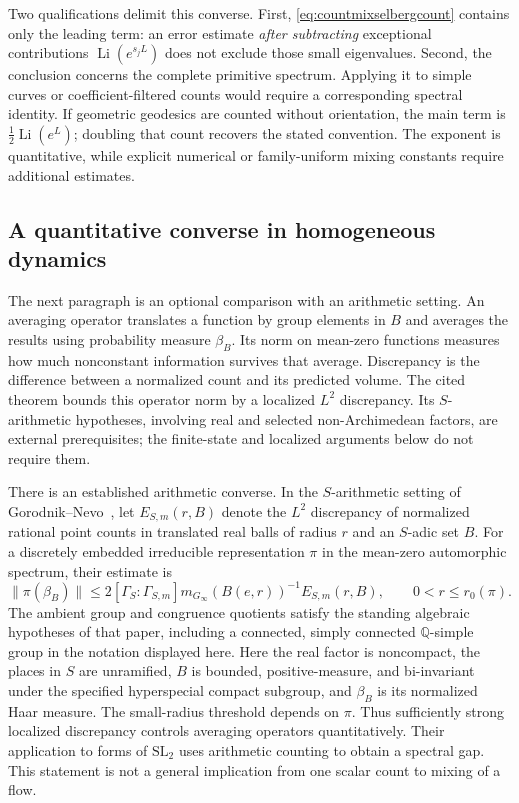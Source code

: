 Two qualifications delimit this converse. First,
\eqref{eq:countmixselbergcount} contains only the leading term:
an error estimate \emph{after subtracting} exceptional contributions
$\operatorname{Li}(e^{s_jL})$ does not exclude those small eigenvalues.
Second, the conclusion concerns the complete primitive spectrum.
Applying it to simple curves or coefficient-filtered counts would require
a corresponding spectral identity. If geometric geodesics are counted
without orientation, the main term is
$\tfrac12\operatorname{Li}(e^L)$; doubling that count recovers the stated
convention. The exponent is quantitative, while explicit numerical or
family-uniform mixing constants require additional estimates.

\subsection{A quantitative converse in homogeneous dynamics}

The next paragraph is an optional comparison with an arithmetic
setting. An averaging operator translates a function by group
elements in $B$ and averages the results using probability measure
$\beta_B$. Its norm on mean-zero functions measures how much
nonconstant information survives that average. Discrepancy is the
difference between a normalized count and its predicted volume.
The cited theorem bounds this operator norm by a localized $L^2$
discrepancy. Its $S$-arithmetic hypotheses, involving real and
selected non-Archimedean factors, are external prerequisites;
the finite-state and localized arguments below do not require them.

There is an established arithmetic converse. In the $S$-arithmetic
setting of Gorodnik--Nevo~\cite[Theorems 1.4 and 5.2]{GNDiscrepancy},
let $E_{S,m}(r,B)$ denote the $L^2$ discrepancy of normalized rational
point counts in translated real balls of radius $r$ and an
$S$-adic set $B$. For a discretely embedded irreducible representation
$\pi$ in the mean-zero automorphic spectrum, their estimate is
\begin{equation}
 \|\pi(\beta_B)\|
 \leq 2[\Gamma_S:\Gamma_{S,m}]
       m_{G_\infty}(B(e,r))^{-1}E_{S,m}(r,B),
 \qquad 0<r\leq r_0(\pi).
 \label{eq:countmixGN}
\end{equation}
The ambient group and congruence quotients satisfy the standing
algebraic hypotheses of that paper, including a connected, simply
connected $\mathbb Q$-simple group in the notation displayed here.
Here the real factor is noncompact, the places in $S$ are unramified,
$B$ is bounded, positive-measure, and bi-invariant under the specified
hyperspecial compact subgroup, and $\beta_B$ is its normalized Haar
measure. The small-radius threshold depends on $\pi$.
Thus sufficiently strong localized discrepancy controls averaging
operators quantitatively. Their application to forms of $\mathrm{SL}_2$
uses arithmetic counting to obtain a spectral gap. This statement is
not a general implication from one scalar count to mixing of a flow.


